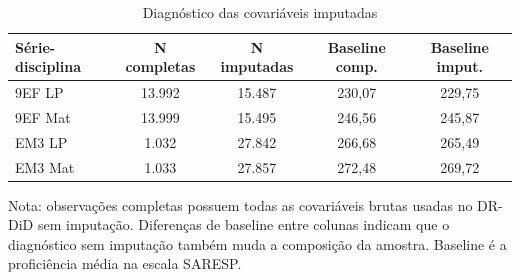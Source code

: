 \begin{table}[htbp]
\centering
\caption{Diagnóstico das covariáveis imputadas}
\label{tab:diagnostico_imputacao}
\begin{tabular}{lcccc}
\toprule
Série-disciplina & N completas & N imputadas & Baseline comp. & Baseline imput. \\
\midrule
9EF LP & 13.992 & 15.487 & 230,07 & 229,75 \\
9EF Mat & 13.999 & 15.495 & 246,56 & 245,87 \\
EM3 LP & 1.032 & 27.842 & 266,68 & 265,49 \\
EM3 Mat & 1.033 & 27.857 & 272,48 & 269,72 \\
\bottomrule
\end{tabular}
\vspace{0.2cm}
\begin{flushleft}
\footnotesize Nota: observações completas possuem todas as covariáveis brutas usadas no DR-DiD sem imputação. Diferenças de baseline entre colunas indicam que o diagnóstico sem imputação também muda a composição da amostra. Baseline é a proficiência média na escala SARESP.
\end{flushleft}
\end{table}
